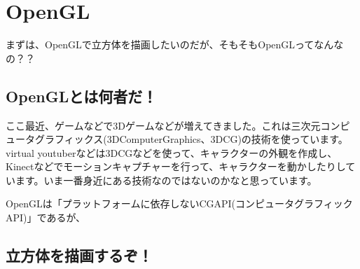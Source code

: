 \documentclass[12pt,a4paper,titlepage]{jsarticle}
\begin{document}
\section{OpenGL}
まずは、OpenGLで立方体を描画したいのだが、そもそもOpenGLってなんなの？？

\subsection{OpenGLとは何者だ！}
ここ最近、ゲームなどで3Dゲームなどが増えてきました。これは三次元コンピュータグラフィックス(3DComputerGraphics、3DCG)の技術を使っています。virtual youtuberなどは3DCGなどを使って、キャラクターの外観を作成し、Kinectなどでモーションキャプチャーを行って、キャラクターを動かしたりしています。いま一番身近にある技術なのではないのかなと思っています。

OpenGLは「プラットフォームに依存しないCGAPI(コンピュータグラフィックAPI)」であるが、

\subsection{立方体を描画するぞ！}
\end{document}
